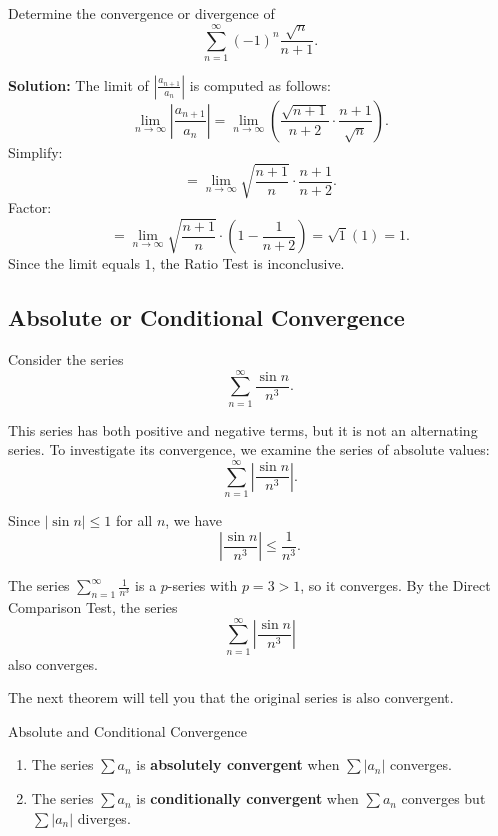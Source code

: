 \documentclass[12pt]{article}
\theoremstyle{beautifulthm}
\begin{document}
\begin{tcolorbox}[colback=examplebg, colframe=red!75!black, title=\textbf{EXAMPLE 3: A Failure of the Ratio Test}, fonttitle=\bfseries, sharp corners]

Determine the convergence or divergence of
\[
\sum_{n=1}^\infty (-1)^n \frac{\sqrt{n}}{n+1}.
\]

\tcblower
\textbf{Solution:} 
The limit of $\left| \frac{a_{n+1}}{a_n} \right|$ is computed as follows:
\[
\lim_{n \to \infty} \left| \frac{a_{n+1}}{a_n} \right| = \lim_{n \to \infty} \left( \frac{\sqrt{n+1}}{n+2} \cdot \frac{n+1}{\sqrt{n}} \right).
\]
Simplify:
\[
= \lim_{n \to \infty} \sqrt{\frac{n+1}{n}} \cdot \frac{n+1}{n+2}.
\]
Factor:
\[
= \lim_{n \to \infty} \sqrt{\frac{n+1}{n}} \cdot \left( 1 - \frac{1}{n+2} \right) = \sqrt{1}(1) = 1.
\]
Since the limit equals $1$, the Ratio Test is inconclusive.
\end{tcolorbox}

\newpage


\subsection{Absolute
or Conditional
Convergence}

Consider the series
\[
\sum_{n=1}^\infty \frac{\sin n}{n^3}.
\]

This series has both positive and negative terms, but it is not an alternating series. To investigate its convergence, we examine the series of absolute values:
\[
\sum_{n=1}^\infty \left| \frac{\sin n}{n^3} \right|.
\]

Since $|\sin n| \leq 1$ for all $n$, we have
\[
\left| \frac{\sin n}{n^3} \right| \leq \frac{1}{n^3}.
\]

The series $\sum_{n=1}^\infty \frac{1}{n^3}$ is a $p$-series with $p = 3 > 1$, so it converges. By the Direct Comparison Test, the series
\[
\sum_{n=1}^\infty \left| \frac{\sin n}{n^3} \right|
\]
also converges.

The next theorem will tell you that the original series is also convergent.

\begin{Definition}{Absolute and Conditional Convergence}{}

\begin{enumerate}
    \item The series $\sum a_n$ is \textbf{absolutely convergent} when $\sum |a_n|$ converges.
    \item The series $\sum a_n$ is \textbf{conditionally convergent} when $\sum a_n$ converges but $\sum |a_n|$ diverges.
\end{enumerate}

    
\end{Definition}
\end{document}
